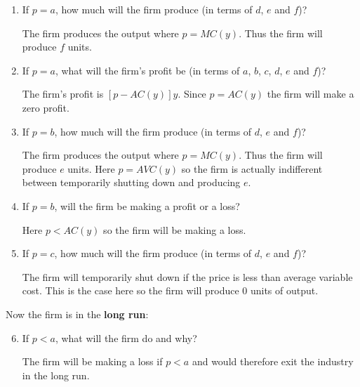 \documentclass[12pt]{article}
\newcounter{question}[section]
\newenvironment{subquestions}{
  \begin{enumerate}[label=(\roman*)]}{\end{enumerate}}
\begin{document}
\begin{subquestions}
  \item If $p=a$, how much will the firm produce (in terms of $d$, $e$ and $f$)?

    \textcolor{solution-color}{
      The firm produces the output where $p=MC\left( y \right)$. Thus the firm
      will produce $f$ units.
    }
  \item If $p=a$, what will the firm's profit be (in terms of $a$, $b$, $c$,
    $d$, $e$ and $f$)?

    \textcolor{solution-color}{
      The firm's profit is $\left[ p-AC\left( y \right) \right]y$. Since
      $p=AC\left( y \right)$ the firm will make a zero profit.
    }
  \item If $p=b$, how much will the firm produce (in terms of $d$, $e$ and $f$)?

    \textcolor{solution-color}{
      The firm produces the output where $p=MC\left( y \right)$. Thus the firm
      will produce $e$ units. Here $p=AVC\left( y \right)$ so the firm is
      actually indifferent between temporarily shutting down and producing $e$.
    }
  \item If $p=b$, will the firm be making a profit or a loss?

    \textcolor{solution-color}{
      Here $p<AC\left( y \right)$ so the firm will be making a loss.
    }
  \item If $p=c$, how much will the firm produce (in terms of $d$, $e$ and $f$)?

    \textcolor{solution-color}{
      The firm will temporarily shut down if the price is less than average
      variable cost. This is the case here so the firm  will produce 0 units of
      output.
    }
\end{subquestions}
Now the firm is in the \textbf{long run}:
\begin{subquestions}
  \setcounter{enumi}{5}
  \item If $p<a$, what will the firm do and why?

    \textcolor{solution-color}{
      The firm will be making a loss if $p<a$ and would therefore exit the
      industry in the long run.
    }
\end{subquestions}
\end{document}
